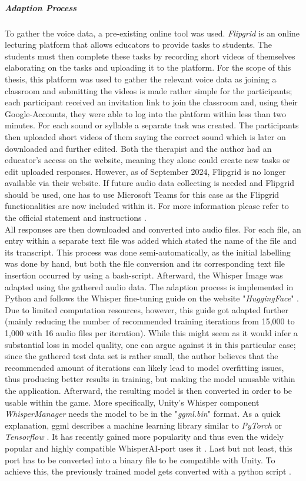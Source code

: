 \documentclass[draft,final]{vutinfth} %
\begin{document}
\subparagraph{Adaption Process}
To gather the voice data, a pre-existing online tool was used. \emph{Flipgrid} \cite{Flip} is an online lecturing platform that allows educators to provide tasks to students. The students must then complete these tasks by recording short videos of themselves elaborating on the tasks and uploading it to the platform. For the scope of this thesis, this platform was used to gather the relevant voice data as joining a classroom and submitting the videos is made rather simple for the participants; each participant received an invitation link to join the classroom and, using their Google-Accounts, they were able to log into the platform within less than two minutes. For each sound or syllable a separate task was created. The participants then uploaded short videos of them saying the correct sound which is later on downloaded and further edited. Both the therapist and the author had an educator's access on the website, meaning they alone could create new tasks or edit uploaded responses. However, as of September 2024, Flipgrid is no longer available via their website. If future audio data collecting is needed and Flipgrid should be used, one has to use Microsoft Teams for this case as the Flipgrid functionalities are now included within it. For more information please refer to the official statement and instructions \cite{Flip}.\\
All responses are then downloaded and converted into audio files. For each file, an entry within a separate text file was added which stated the name of the file and its transcript. This process was done semi-automatically, as the initial labelling was done by hand, but both the file conversion and its corresponding text file insertion occurred by using a bash-script. Afterward, the Whisper Image was adapted using the gathered audio data. The adaption process is implemented in Python and follows the Whisper fine-tuning guide on the website "\emph{HuggingFace}" \cite{Huggingface}. Due to limited computation resources, however, this guide got adapted further (mainly reducing the number of recommended training iterations from 15,000 to 1,000 with 16 audio files per iteration). While this might seem as it would infer a substantial loss in model quality, one can argue against it in this particular case; since the gathered test data set is rather small, the author believes that the recommended amount of iterations can likely lead to model overfitting issues, thus producing better results in training, but making the model unusable within the application. Afterward, the resulting model is then converted in order to be usable within the game. More specifically, Unity's Whisper component \emph{WhisperManager} needs the model to be in the "\emph{ggml.bin}" \cite{ggml} format. As a quick explanation, ggml describes a machine learning library similar to \emph{PyTorch} or \emph{Tensorflow} \cite{ggmlInto}. It has recently gained more popularity and thus even the widely popular and highly compatible WhisperAI-port \cite{whisperCpp} uses it . Last but not least, this port has to be converted into a binary file to be compatible with Unity. To achieve this, the previously trained model gets converted with a python script \cite{WhisperConv}. 
\end{document}
